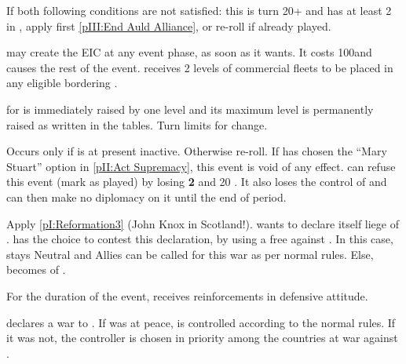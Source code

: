 

\condition{}
\aparag If both following conditions are not satisfied: this is turn 20+ and
\ENG has at least 2 \TP in , apply first \ref{pIII:End Auld
  Alliance}, or re-roll if already played.

\phevnt
\aparag \ENG may create the EIC at any event phase, as soon as it wants. It
costs 100\ducats and causes the rest of the event.
\aparag \ENG receives 2 levels of commercial fleets to be placed in any
eligible \STZ bordering .

\effetlong
\aparag \FTI for \ENG is immediately raised by one level and its maximum level
is permanently raised as written in the tables.
\aparag Turn limits for \ANG change.





\condition{}
\aparag Occurs only if \paysecosse is at present inactive. Otherwise re-roll.
\aparag If \ANG has chosen the ``Mary Stuart'' option in \ref{pII:Act
  Supremacy}, this event is void of any effect.
\aparag \ENG can refuse this event (mark as played) by losing {\bf 2} \STAB
and 20 \VP. It also loses the control of \paysecosse and can then make no
diplomacy on it until the end of period.

\phevnt
\aparag Apply \ref{pI:Reformation3} (John Knox in Scotland!).
\aparag \paysecosse wants to declare itself liege of \FRA.  \ENG has the
choice to contest this declaration, by using a free \CB against \paysecosse.
In this case, \paysecosse stays Neutral and Allies can be called for this war
as per normal rules. Else, \paysecosse becomes \VASSAL of \FRA.

\phadm
\aparag For the duration of the event, \paysecosse receives reinforcements in
defensive attitude.






\phevnt
\aparag \paysDanemark declares a war to \SUE. If \SUE was at peace,
\paysDanemark is controlled according to the normal rules. If it was not, the
controller is chosen in priority among the countries at war against \SUE.

